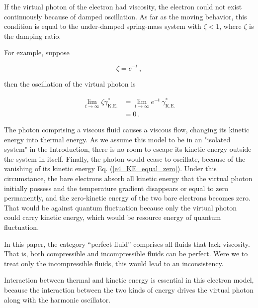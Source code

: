 \documentclass[%
 reprint,
 amsmath,amssymb,
 aps,
]{revtex4-1}
\numberwithin{equation}{section}
\begin{document}
    If the virtual photon of the electron had viscosity, the electron could not exist continuously because of damped oscillation. As far as the moving behavior, this condition is equal to the under-damped spring-mass system with $\zeta < 1$, where $\zeta$ is the damping ratio.

    For example, suppose

        \begin{equation}
            \zeta = e^{-t}
            \ ,
        \end{equation}

    then the oscillation of the virtual photon is

        \begin{equation}
            \begin{split}
                \lim_{t \to \infty} \zeta \gamma^{*}_{\mathrm{K.E.}}
                &= \lim_{t \to \infty} e^{-t} \   \gamma^{*}_{\mathrm{K.E.}} \\
                &= 0
                \ .
                \label{e4_KE_equal_zero}
            \end{split}
        \end{equation}

    The photon comprising a viscous fluid causes a viscous flow, changing its kinetic energy into thermal energy. As we assume this model to be in an "isolated system" in the Introduction, there is no room to escape its kinetic energy outside the system in itself. Finally, the photon would cease to oscillate, because of the vanishing of its kinetic energy Eq. (\ref{e4_KE_equal_zero}). Under this circumstance, the bare electrons absorb all kinetic energy that the virtual photon initially possess and the temperature gradient disappears or equal to zero permanently, and the zero-kinetic energy of the two bare electrons becomes zero. That would be against quantum fluctuation because only the virtual photon could carry kinetic energy, which would be resource energy of quantum fluctuation.

    In this paper, the category ``perfect fluid'' comprises all fluids that lack viscosity. That is, both compressible and incompressible fluids can be perfect. Were we to treat only the incompressible fluids, this would lead to an inconsistency.

    Interaction between thermal and kinetic energy is essential in this electron model, because the interaction between the two kinds of energy drives the virtual photon along with the harmonic oscillator.
\end{document}
